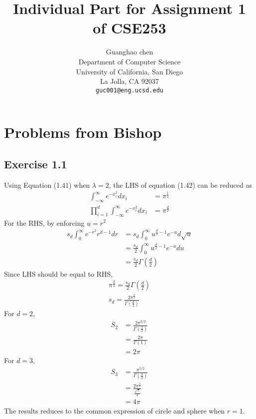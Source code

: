 \documentclass{article} %
\title{Individual Part for Assignment 1 of CSE253}
\author{
Guanghao chen \\
Department of Computer Science\\
University of California, San Diego\\
La Jolla, CA 92037 \\
\texttt{guc001@eng.ucsd.edu}\\
}
\begin{document}
\maketitle
\section{Problems from Bishop}
\subsection{Exercise 1.1}
Using Equation (1.41) when $\lambda =2$, the LHS of equation (1.42) can be reduced as
\begin{equation}
\begin{split}
        \int_{-\infty}^{\infty}e^{-x_i^2}dx_i &= \pi^{\frac{1}{2}} \\
    \prod_{i=1}^d\int_{-\infty}^{\infty}e^{-x_i^2}dx_i&= \pi^{\frac{d}{2}}
    \end{split} 
\end{equation}
For the RHS, by enforcing $u=r^2$
\begin{equation}
    \begin{split}
        s_d\int_0^{\infty}e^{-r^2}r^{d-1}dr &= s_d \int_0^{\infty} u^{\frac{d}{2}-1}e^{-u}d\sqrt{u}\\
        &=\frac{s_d}{2}\int_0^{\infty} u^{\frac{d}{2}-1}e^{-u}du\\
        &=\frac{s_d}{2}\Gamma(\frac{d}{2})
    \end{split}
\end{equation}
Since LHS should be equal to RHS,
\begin{equation}
\begin{split}
\pi^{\frac{d}{2}} = \frac{s_d}{2}\Gamma(\frac{d}{2})\\
s_d = \frac{2\pi^{\frac{d}{2}}}{\Gamma(\frac{d}{2})}
\end{split}
\end{equation}
For $d=2$,
\begin{equation}
    \begin{split}
        S_2 &=\frac{2\pi^{2/2}}{\Gamma(\frac{2}{2})} \\
            &= \frac{2\pi}{\Gamma(1)} \\
            &= 2\pi
    \end{split}
\end{equation}
For $d=3$,
\begin{equation}
    \begin{split}
        S_3 & = \frac{\pi^{3/2}}{\Gamma(\frac{3}{2})}\\
            & = \frac{2\pi^{\frac{3}{2}}}{\frac{\sqrt{\pi}}{2}} \\
            & = 4\pi
    \end{split}
\end{equation}
The results reduces to the common expression of circle and sphere when $r=1$.
\end{document}
